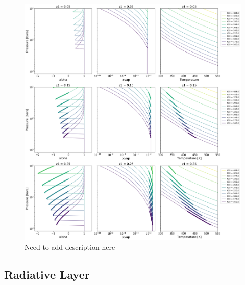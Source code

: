 \documentclass[11pt]{ucscthesisbs}
\begin{document}
\begin{figure}[ht!]
 \centerline{
  \includegraphics[width=7.0in]{figures/convection_inhibited_2.png}
 }
\caption[Inhibition of convection on Uranus]
{Need to add description here }
\label{fig:uranus}
\end{figure}
\subsection{Radiative Layer}
\end{document}
